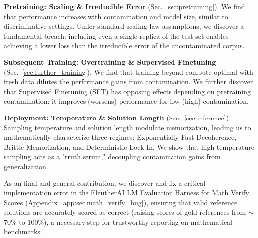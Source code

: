 \textbf{Pretraining: Scaling \& Irreducible Error} (Sec.~\ref{sec:pretraining}). We find that performance increases with contamination and model size, similar to discriminative settings. Under standard scaling law assumptions, we discover a fundamental breach: including even a single replica of the test set enables achieving a lower loss than the irreducible error of the uncontaminated corpus.
    
\textbf{Subsequent Training: Overtraining \& Supervised Finetuning} (Sec.~\ref{sec:further_training}). We find that training beyond compute-optimal with fresh data dilutes the performance gains from contamination. We further discover that Supervised Finetuning (SFT) has opposing effects depending on pretraining contamination: it improves (worsens) performance for low (high) contamination.

\textbf{Deployment: Temperature \& Solution Length} (Sec.~\ref{sec:inference}) Sampling temperature and solution length modulate memorization, leading us to mathematically characterize three regimes: Exponentially Fast Decoherence, Brittle Memorization, and Deterministic Lock-In. We show that high-temperature sampling acts as a "truth serum," decoupling contamination gains from generalization.

As an final and general contribution, we discover and fix a critical implementation error in the EleutherAI LM Evaluation Harness \citep{gao2024evalharness} for Math Verify Scores (Appendix~\ref{app:sec:math_verify_bug}), ensuring that valid reference solutions are accurately scored as correct (raising scores of gold references from $\mathord{\sim}$70\% to 100\%), a necessary step for trustworthy reporting on mathematical benchmarks.
